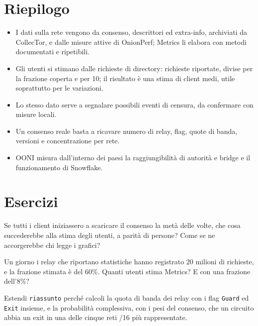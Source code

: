 \section*{Riepilogo}
\begin{itemize}
  \item I dati sulla rete vengono da consenso, descrittori ed extra-info, archiviati da CollecTor, e dalle misure attive di OnionPerf; Metrics li elabora con metodi documentati e ripetibili.
  \item Gli utenti si stimano dalle richieste di directory: richieste riportate, divise per la frazione coperta e per 10; il risultato è una stima di client medi, utile soprattutto per le variazioni.
  \item Lo stesso dato serve a segnalare possibili eventi di censura, da confermare con misure locali.
  \item Un consenso reale basta a ricavare numero di relay, flag, quote di banda, versioni e concentrazione per rete.
  \item OONI misura dall'interno dei paesi la raggiungibilità di autorità e bridge e il funzionamento di Snowflake.
\end{itemize}

\section*{Esercizi}

\begin{esercizio}[1]\label{es:24-dieci}
Se tutti i client iniziassero a scaricare il consenso la metà delle volte, che cosa succederebbe alla stima degli utenti, a parità di persone? Come se ne accorgerebbe chi legge i grafici?
\end{esercizio}

\begin{esercizio}[1]\label{es:24-frazione}
Un giorno i relay che riportano statistiche hanno registrato 20 milioni di richieste, e la frazione stimata è del 60\%. Quanti utenti stima Metrics? E con una frazione dell'8\%?
\end{esercizio}

\begin{esercizio}[2]\label{es:24-flag}
Estendi \texttt{riassunto} perché calcoli la quota di banda dei relay con i flag \texttt{Guard} ed \texttt{Exit} insieme, e la probabilità complessiva, con i pesi del consenso, che un circuito abbia un exit in una delle cinque reti /16 più rappresentate.
\end{esercizio}

